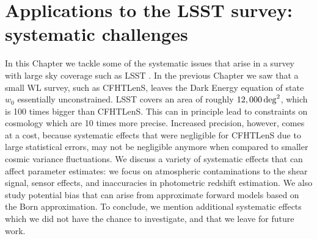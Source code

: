 
\chapter{Applications to the LSST survey: systematic challenges}
\lhead[\fancyplain{}{\thepage}]{\fancyplain{}{\rightmark}}
 \thispagestyle{plain}
\setlength{\parindent}{10mm}
\label{chp:7}

In this Chapter we tackle some of the systematic issues that arise in a survey with large sky coverage such as LSST \citep{LSST}. In the previous Chapter we saw that a small WL survey, such as CFHTLenS, leaves the Dark Energy equation of state $w_0$ essentially unconstrained. LSST covers an area of roughly $12,000\,{\rm deg}^2$, which is 100 times bigger than CFHTLenS. This can in principle lead to constraints on cosmology which are 10 times more precise. Increased precision, however, comes at a cost, because systematic effects that were negligible for CFHTLenS due to large statistical errors, may not be negligible anymore when compared to smaller cosmic variance fluctuations. We discuss a variety of systematic effects that can affect parameter estimates: we focus on atmospheric contaminations to the shear signal, sensor effects, and inaccuracies in photometric redshift estimation. We also study potential bias that can arise from approximate forward models based on the Born approximation. To conclude, we mention additional systematic effects which we did not have the chance to investigate, and that we leave for future work.    

